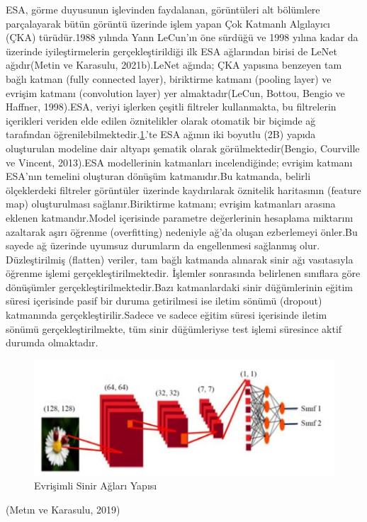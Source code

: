\documentclass[12pt,twoside]{deuthesis}
\begin{document}
ESA, görme duyusunun işlevinden faydalanan, görüntüleri alt bölümlere parçalayarak bütün görüntü üzerinde işlem yapan Çok Katmanlı Algılayıcı (ÇKA) türüdür.1988 yılında Yann LeCun'ın öne sürdüğü ve 1998 yılına kadar da üzerinde iyileştirmelerin gerçekleştirildiği ilk ESA ağlarından birisi de LeNet ağıdır(Metin ve Karasulu, 2021b).LeNet ağında; ÇKA yapısına benzeyen tam bağlı katman (fully connected layer), biriktirme katmanı (pooling layer) ve evrişim katmanı (convolution layer) yer almaktadır(LeCun, Bottou, Bengio ve Haffner, 1998).ESA, veriyi işlerken çeşitli filtreler kullanmakta, bu filtrelerin içerikleri veriden elde edilen öznitelikler olarak otomatik bir biçimde ağ tarafından öğrenilebilmektedir.\ref{fig:cnn1}.'te ESA ağının iki boyutlu (2B) yapıda oluşturulan modeline dair altyapı şematik olarak görülmektedir(Bengio, Courville ve Vincent, 2013).ESA modellerinin katmanları incelendiğinde; evrişim katmanı ESA'nın temelini oluşturan dönüşüm katmanıdır.Bu katmanda, belirli ölçeklerdeki filtreler görüntüler üzerinde kaydırılarak öznitelik haritasının (feature map) oluşturulması sağlanır.Biriktirme katmanı; evrişim katmanları arasına eklenen katmandır.Model içerisinde parametre değerlerinin hesaplama miktarını azaltarak aşırı öğrenme (overfitting) nedeniyle ağ'da oluşan ezberlemeyi önler.Bu sayede ağ üzerinde uyumsuz durumların da engellenmesi sağlanmış olur. Düzleştirilmiş (flatten) veriler, tam bağlı katmanda alınarak sinir ağı vasıtasıyla öğrenme işlemi gerçekleştirilmektedir. İşlemler sonrasında belirlenen sınıflara göre dönüşümler gerçekleştirilmektedir.Bazı katmanlardaki sinir düğümlerinin eğitim süresi içerisinde pasif bir duruma getirilmesi ise iletim sönümü (dropout) katmanında gerçekleştirilir.Sadece ve sadece eğitim süresi içerisinde iletim sönümü gerçekleştirilmekte, tüm sinir düğümleriyse test işlemi süresince aktif durumda olmaktadır.
\begin{figure}

{\centering \includegraphics[width=1\linewidth,height=0.27\textheight]{figure/cnn_1} 

}

\caption{Evrişimli Sinir Ağları Yapısı}\label{fig:cnn1}
\end{figure}
(Metın ve Karasulu, 2019)
\end{document}
